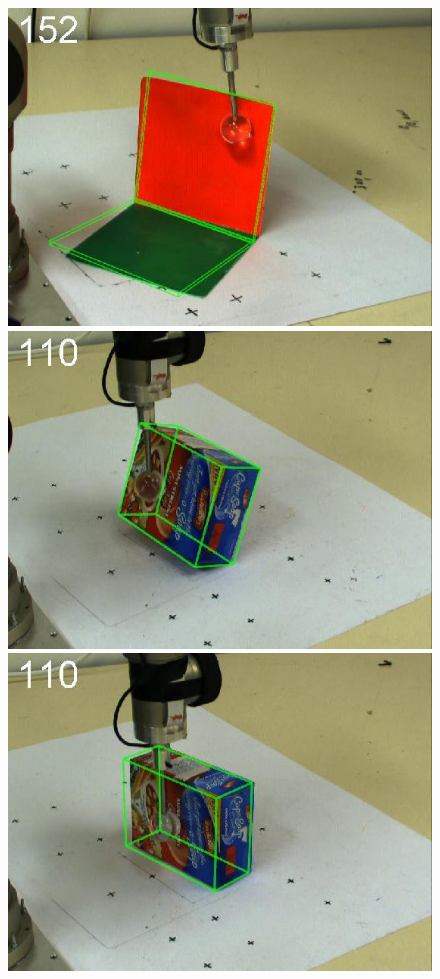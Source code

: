 \begin{figure}[htbp]
{\includegraphics[width=\imgAXwid]{./A1_2exp_876_2}
\includegraphics[width=\imgAXwid]{./A2_2exp_399_2}
\includegraphics[width=\imgAXwid]{./A2_2exp_87_2}
}
\end{figure}
